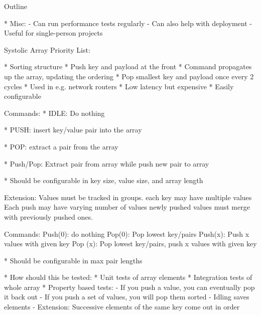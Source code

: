 \begin{frame}[fragile]{Outline}
\begin{itemize}
		* Misc:
			- Can run performance tests regularly
			- Can also help with deployment
			- Useful for single-person projects
			
	Systolic Array Priority List:
		
		* Sorting structure
		* Push key and payload at the front
		* Command propagates up the array, updating the ordering
		* Pop smallest key and payload once every 2 cycles
		* Used in e.g. network routers
		* Low latency but expensive
		* Easily configurable
		
		Commands:
			* IDLE: Do nothing
					
			* PUSH: insert key/value pair into the array

			* POP: extract a pair from the array
			
			* Push/Pop: Extract pair from array while push new pair to array
			
		* Should be configurable in key size, value size, and array length			
			
		Extension:
			Values must be tracked in groups. 
			each key may have multiple values
			Each push may have varying number of values
			newly pushed values must merge with previously pushed ones.
	
			Commands:
				Push(0): do nothing
				Pop(0): Pop lowest key/pairs
				Push(x): Push x values with given key
				Pop (x): Pop lowest key/pairs, push x values with given key
				
		* Should be configurable in max pair lengths
		
		* How should this be tested:
			* Unit tests of array elements
			* Integration tests of whole array
			* Property based tests:
				- If you push a value, you can eventually pop it back out
				- If you push a set of values, you will pop them sorted
				- Idling saves elements
				- Extension: Successive elements of the same key come out in order

\end{itemize}
\end{frame}

